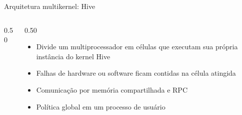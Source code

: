 \documentclass[aspectratio=169]{beamer}
\begin{document}
{\begin{frame}{Arquitetura multikernel: Hive}
\begin{columns}[c]
\begin{column}{0.50\textwidth}
                \end{column}
                \begin{column}{0.50\textwidth}
                    \begin{itemize}
                        \item Divide um multiprocessador em células que executam sua própria instância do kernel Hive
                        \item Falhas de hardware ou software ficam contidas na célula atingida
                        \item Comunicação por memória compartilhada e RPC
                        \item Política global em um processo de usuário
                    \end{itemize}
                \end{column}
            \end{columns}
        \end{frame}

}
\end{document}
